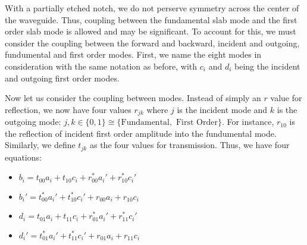 \documentclass[10pt, letter, oneside,graphicx]{article}
\begin{document}
With a partially etched notch, we do not perserve symmetry across the center of the waveguide. Thus, coupling between the fundamental slab mode and the first order slab mode is allowed and may be significant. To account for this, we must consider the coupling between the forward and backward, incident and outgoing, fundumental and first order modes. First, we name the eight modes in consideration with the same notation as before, with $c_i$ and $d_i$ being the incident and outgoing first order modes.
\newcommand{\m}{1.8}
\begin{center}
\end{center}
Now let us consider the coupling between modes. Instead of simply an $r$ value for reflection, we now have four values $r_{jk}$ where $j$ is the incident mode and $k$ is the outgoing mode: $j, k \in \{ 0, 1 \} \cong \{ \text{Fundamental}, \text{ First Order} \}$. For instance, $r_{10}$ is the reflection of incident first order amplitude into the fundumental mode. Similarly, we define $t_{jk}$ as the four values for transmission. Thus, we have four equations:
\begin{itemize}
\item $b_i = t_{00}a_i + t_{10}c_i + r_{00}^*a_i' + r_{10}^*c_i'$
\item $b_i' = t_{00}^*a_i' + t_{10}^*c_i' + r_{00}a_i + r_{10}c_i$
\item $d_i = t_{01}a_i + t_{11}c_i + r_{01}^*a_i' + r_{11}^*c_i'$
\item $d_i' = t_{01}^*a_i' + t_{11}^*c_i' + r_{01}a_i + r_{11}c_i$
\end{itemize}
\end{document}
